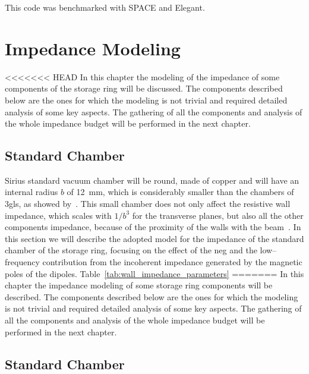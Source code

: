     This code was benchmarked with SPACE\cite{Bassi2016} and Elegant\cite{Borland2000}.


\chapter{Impedance Modeling}\label{cap:impedance_modeling}

<<<<<<< HEAD
    In this chapter the modeling of the impedance of some components of the storage ring will be discussed. The components described below are the ones for which the modeling is not trivial and required detailed analysis of some key aspects. The gathering of all the components and analysis of the whole impedance budget will be performed in the next chapter.

\section{Standard Chamber}\label{sec:standard_chamber}

    Sirius standard vacuum chamber will be round, made of copper and will have an internal radius $b$ of \SI{12}{\milli\meter}, which is considerably smaller than the chambers of \gls{3gls}, as showed by~.
    This small chamber does not only affect the resistive wall impedance, which scales with $1/b^3$ for the transverse planes, but also all the other components impedance, because of the proximity of the walls with the beam~\cite{Nagaoka2014}. In this section we will describe the adopted model for the impedance of the standard chamber of the storage ring, focusing on the effect of the \gls{neg} and the low--frequency contribution from the \citeauthor{Laslett1963} incoherent impedance generated by the magnetic poles of the dipoles. Table~\ref{tab:wall_impedance_parameters}
=======
    In this chapter the impedance modeling of some storage ring components will be described. The components described below are the ones for which the modeling is not trivial and required detailed analysis of some key aspects. The gathering of all the components and analysis of the whole impedance budget will be performed in the next chapter.

\section{Standard Chamber}\label{sec:standard_chamber}

